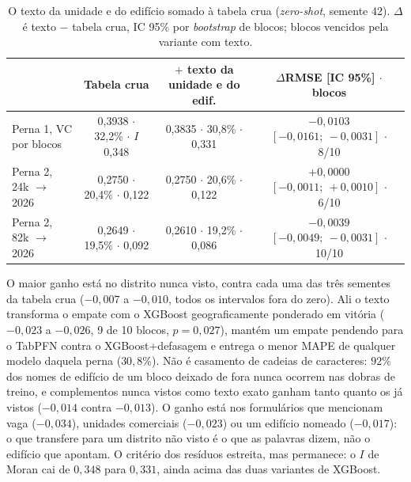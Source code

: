 \documentclass[11pt,a4paper]{article}
\begin{document}
\begin{table}[h]
\centering\small
\caption{O texto da unidade e do edifício somado à tabela crua (\emph{zero-shot}, semente 42).
$\Delta$ é texto $-$ tabela crua, IC 95\% por \emph{bootstrap} de blocos; blocos vencidos pela
variante com texto.}
\label{tab:text}
\scriptsize\setlength{\tabcolsep}{2.8pt}
\begin{tabular}{lccc}
\toprule
 & Tabela crua & $+$ texto da unidade e do edif. & $\Delta$RMSE [IC 95\%] $\cdot$ blocos \\
\midrule
Perna 1, VC por blocos & 0,3938 $\cdot$ 32,2\% $\cdot$ $I$ 0,348 & 0,3835 $\cdot$ 30,8\% $\cdot$ 0,331 & $-0{,}0103$ $[-0{,}0161;\ -0{,}0031]$ $\cdot$ 8/10 \\
Perna 2, 24k $\to$ 2026 & 0,2750 $\cdot$ 20,4\% $\cdot$ 0,122 & 0,2750 $\cdot$ 20,6\% $\cdot$ 0,122 & $+0{,}0000$ $[-0{,}0011;\ +0{,}0010]$ $\cdot$ 6/10 \\
Perna 2, 82k $\to$ 2026 & 0,2649 $\cdot$ 19,5\% $\cdot$ 0,092 & 0,2610 $\cdot$ 19,2\% $\cdot$ 0,086 & $-0{,}0039$ $[-0{,}0049;\ -0{,}0031]$ $\cdot$ 10/10 \\
\bottomrule
\end{tabular}
\end{table}

O maior ganho está no distrito nunca visto, contra cada uma das três sementes da tabela crua
($-0{,}007$ a $-0{,}010$, todos os intervalos fora do zero). Ali o texto transforma o empate
com o XGBoost geograficamente ponderado em vitória ($-0{,}023$ a $-0{,}026$, 9 de 10 blocos,
$p = 0{,}027$), mantém um empate pendendo para o TabPFN contra o XGBoost+defasagem e entrega o
menor MAPE de qualquer modelo daquela perna ($30{,}8\%$). Não é casamento de cadeias de
caracteres: $92\%$ dos nomes de edifício de um bloco deixado de fora nunca ocorrem nas dobras
de treino, e complementos nunca vistos como texto exato ganham tanto quanto os já vistos
($-0{,}014$ contra $-0{,}013$). O ganho está nos formulários que mencionam vaga ($-0{,}034$),
unidades comerciais ($-0{,}023$) ou um edifício nomeado ($-0{,}017$): o que transfere para um
distrito não visto é o que as palavras dizem, não o edifício que apontam. O critério dos
resíduos estreita, mas permanece: o $I$ de Moran cai de $0{,}348$ para $0{,}331$, ainda acima
das duas variantes de XGBoost.
\end{document}

